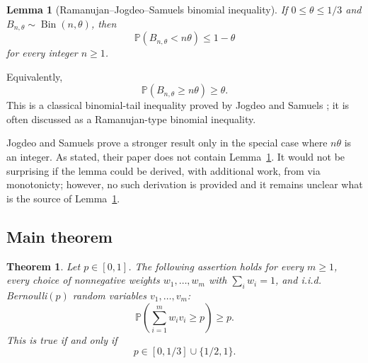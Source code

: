 \documentclass[12pt]{article}
\newtheorem{theorem}{Theorem}
\newtheorem{lemma}{Lemma}
\DeclareMathOperator{\Bin}{Bin}
\newcommand{\review}[1]{\begin{reviewbox}#1\end{reviewbox}}
\begin{document}
\begin{lemma}[Ramanujan--Jogdeo--Samuels binomial inequality]
\label{lem:binomial}
If \(0\le \theta\le 1/3\) and \(B_{n,\theta}\sim \Bin(n,\theta)\), then
\[
\mathbb P(B_{n,\theta}<n\theta)\le 1-\theta
\]
for every integer \(n\ge1\).
\end{lemma}

Equivalently,
\[
\mathbb P(B_{n,\theta}\ge n\theta)\ge \theta .
\]
This is a classical binomial-tail inequality proved by Jogdeo and Samuels
\cite{JogdeoSamuels1968}; it is often discussed as a Ramanujan-type binomial
inequality.

\review{Jogdeo and Samuels \cite{JogdeoSamuels1968} prove a stronger result only in the special case where $n\theta$ is an integer. As stated, their paper does not contain Lemma~\ref{lem:binomial}. It would not be surprising if the lemma could be derived, with additional work, from \cite[Theorem~2.1]{JogdeoSamuels1968} via monotonicty; however, no such derivation is provided and it remains unclear what is the source of Lemma~\ref{lem:binomial}.}

\subsection*{Main theorem}

\begin{theorem}
\label{thm:main}
Let \(p\in[0,1]\). The following assertion holds for every \(m\ge1\), every
choice of nonnegative weights \(w_1,\ldots,w_m\) with \(\sum_i w_i=1\), and
i.i.d. Bernoulli\((p)\) random variables \(v_1,\ldots,v_m\):
\[
\mathbb P\!\left(\sum_{i=1}^m w_i v_i\ge p\right)\ge p.
\]
This is true if and only if
\[
p\in[0,1/3]\cup\{1/2,1\}.
\]
\end{theorem}
\end{document}
